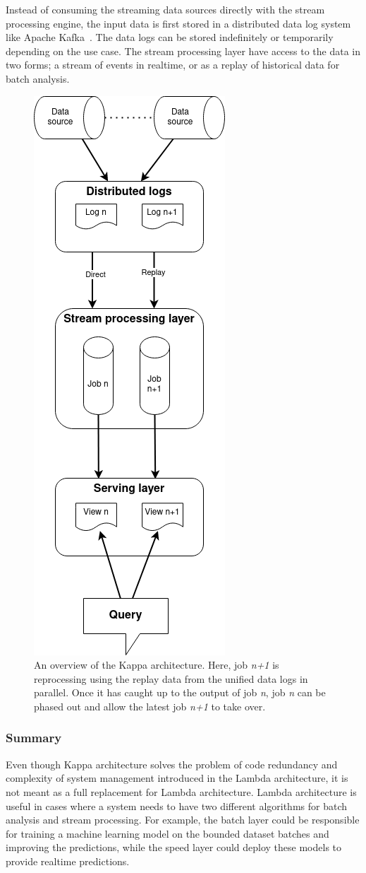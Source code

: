 Instead of consuming the streaming data sources directly with the stream processing engine, 
the input data is first stored in a distributed data log system like Apache Kafka~\cite{kafka}. The data 
logs can be stored indefinitely or temporarily depending on the use case.
The stream processing layer have access to the data in two forms; 
a stream of events in realtime, or as a replay of historical data for batch analysis. 

\begin{figure}[!htbp]
    \centering
    \includegraphics[width=0.4\linewidth]{fig/kappa_arch.png}
    \caption{An overview of the Kappa architecture. Here, job \emph{n+1} is reprocessing using the replay 
    data from the unified data logs in parallel. Once it has caught up to the output of job \emph{n}, 
    job \emph{n} can be phased out and allow the latest job \emph{n+1} to take over.}
    \label{fig:kappa_arch}
\end{figure}


\subsubsection{Summary}%
Even though Kappa architecture solves the problem of code redundancy and complexity of 
system management introduced in the 
Lambda architecture, it is not meant as a full replacement for Lambda architecture. 
Lambda architecture is useful in cases where a system needs to have two different algorithms for 
batch analysis and stream processing. For example, the batch layer could be responsible for training 
a machine learning model on the bounded dataset batches and improving the 
predictions, while the speed layer could deploy these models to provide realtime predictions. 


